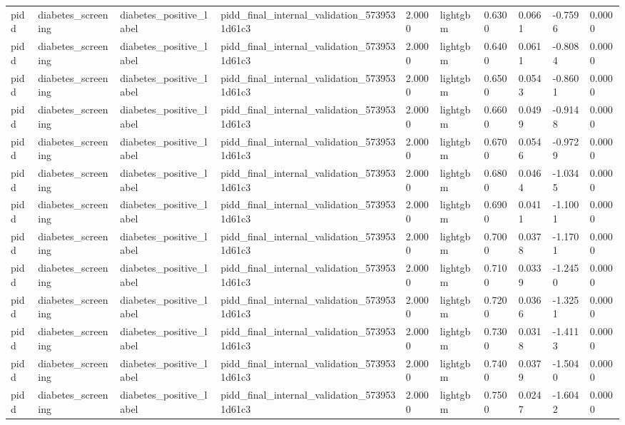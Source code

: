 \begin{tabular}{llllllllll}
pidd & diabetes\_screening & diabetes\_positive\_label & pidd\_final\_internal\_validation\_5739531d61c3 & 2.0000 & lightgbm & 0.6300 & 0.0661 & -0.7596 & 0.0000 \\
pidd & diabetes\_screening & diabetes\_positive\_label & pidd\_final\_internal\_validation\_5739531d61c3 & 2.0000 & lightgbm & 0.6400 & 0.0611 & -0.8084 & 0.0000 \\
pidd & diabetes\_screening & diabetes\_positive\_label & pidd\_final\_internal\_validation\_5739531d61c3 & 2.0000 & lightgbm & 0.6500 & 0.0543 & -0.8601 & 0.0000 \\
pidd & diabetes\_screening & diabetes\_positive\_label & pidd\_final\_internal\_validation\_5739531d61c3 & 2.0000 & lightgbm & 0.6600 & 0.0499 & -0.9148 & 0.0000 \\
pidd & diabetes\_screening & diabetes\_positive\_label & pidd\_final\_internal\_validation\_5739531d61c3 & 2.0000 & lightgbm & 0.6700 & 0.0546 & -0.9729 & 0.0000 \\
pidd & diabetes\_screening & diabetes\_positive\_label & pidd\_final\_internal\_validation\_5739531d61c3 & 2.0000 & lightgbm & 0.6800 & 0.0464 & -1.0345 & 0.0000 \\
pidd & diabetes\_screening & diabetes\_positive\_label & pidd\_final\_internal\_validation\_5739531d61c3 & 2.0000 & lightgbm & 0.6900 & 0.0411 & -1.1001 & 0.0000 \\
pidd & diabetes\_screening & diabetes\_positive\_label & pidd\_final\_internal\_validation\_5739531d61c3 & 2.0000 & lightgbm & 0.7000 & 0.0378 & -1.1701 & 0.0000 \\
pidd & diabetes\_screening & diabetes\_positive\_label & pidd\_final\_internal\_validation\_5739531d61c3 & 2.0000 & lightgbm & 0.7100 & 0.0339 & -1.2450 & 0.0000 \\
pidd & diabetes\_screening & diabetes\_positive\_label & pidd\_final\_internal\_validation\_5739531d61c3 & 2.0000 & lightgbm & 0.7200 & 0.0366 & -1.3251 & 0.0000 \\
pidd & diabetes\_screening & diabetes\_positive\_label & pidd\_final\_internal\_validation\_5739531d61c3 & 2.0000 & lightgbm & 0.7300 & 0.0318 & -1.4113 & 0.0000 \\
pidd & diabetes\_screening & diabetes\_positive\_label & pidd\_final\_internal\_validation\_5739531d61c3 & 2.0000 & lightgbm & 0.7400 & 0.0379 & -1.5040 & 0.0000 \\
pidd & diabetes\_screening & diabetes\_positive\_label & pidd\_final\_internal\_validation\_5739531d61c3 & 2.0000 & lightgbm & 0.7500 & 0.0247 & -1.6042 & 0.0000 \\

\end{tabular}
